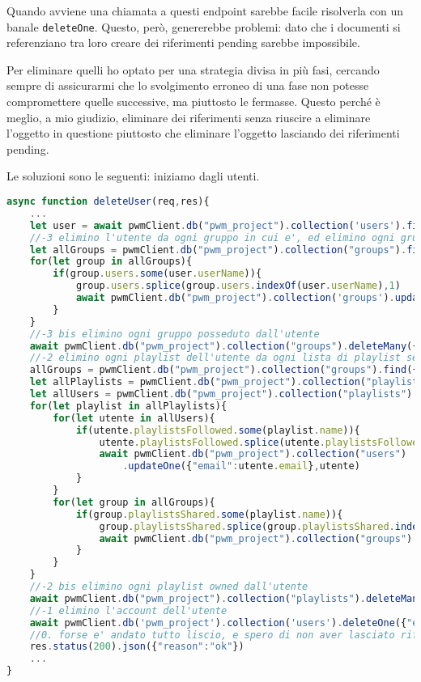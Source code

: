 Quando avviene una chiamata a questi endpoint sarebbe facile risolverla con un banale \verb|deleteOne|. Questo, però, genererebbe problemi: dato che i documenti si referenziano tra loro creare dei riferimenti pending sarebbe impossibile.

Per eliminare quelli ho optato per una strategia divisa in più fasi, cercando sempre di assicurarmi che lo svolgimento erroneo di una fase non potesse compromettere quelle successive, ma piuttosto le fermasse. Questo perché è meglio, a mio giudizio, eliminare dei riferimenti senza riuscire a eliminare l'oggetto in questione piuttosto che eliminare l'oggetto lasciando dei riferimenti pending.

Le soluzioni sono le seguenti: iniziamo dagli utenti.
\begin{lstlisting}[language=JavaScript]
async function deleteUser(req,res){ 
    ...
    let user = await pwmClient.db("pwm_project").collection('users').findOne({"email": decoded.email})
    //-3 elimino l'utente da ogni gruppo in cui e', ed elimino ogni gruppo che sia owned, rimuovendolo prima da ogni utente che sia in quel gruppo
    let allGroups = pwmClient.db("pwm_project").collection("groups").find({})
    for(let group in allGroups){
        if(group.users.some(user.userName)){
            group.users.splice(group.users.indexOf(user.userName),1)
            await pwmClient.db("pwm_project").collection('groups').updateOne({"name":group.name},group)
        }
    }
    //-3 bis elimino ogni gruppo posseduto dall'utente
    await pwmClient.db("pwm_project").collection("groups").deleteMany({"owner":user.userName})
    //-2 elimino ogni playlist dell'utente da ogni lista di playlist seguite altrui
    allGroups = pwmClient.db("pwm_project").collection("groups").find({})
    let allPlaylists = pwmClient.db("pwm_project").collection("playlists").find({"owner":user.userName})
    let allUsers = pwmClient.db("pwm_project").collection("playlists").find({"email":{$not:decoded.email}})
    for(let playlist in allPlaylists){
        for(let utente in allUsers){
            if(utente.playlistsFollowed.some(playlist.name)){
                utente.playlistsFollowed.splice(utente.playlistsFollowed.indexOf(playlist.name),1)
                await pwmClient.db("pwm_project").collection("users")
                    .updateOne({"email":utente.email},utente)
            }
        }
        for(let group in allGroups){
            if(group.playlistsShared.some(playlist.name)){
                group.playlistsShared.splice(group.playlistsShared.indexOf(playlist.name),1)
                await pwmClient.db("pwm_project").collection("groups").updateOne({"name":group.name})
            }
        }
    }
    //-2 bis elimino ogni playlist owned dall'utente
    await pwmClient.db("pwm_project").collection("playlists").deleteMany({"owner":utente.userName})
    //-1 elimino l'account dell'utente
    await pwmClient.db('pwm_project').collection('users').deleteOne({"email":decoded.email})
    //0. forse e' andato tutto liscio, e spero di non aver lasciato riferimenti pending da qualche parte
    res.status(200).json({"reason":"ok"})
    ...
}
\end{lstlisting}
